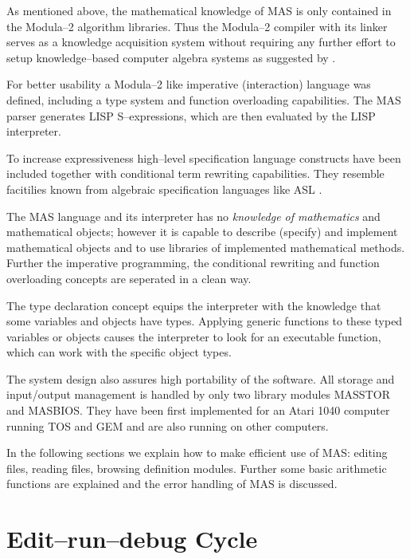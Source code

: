 As mentioned above, the mathematical knowledge 
of MAS is only contained in the Modula--2 algorithm libraries. 
Thus the Modula--2 compiler 
with its linker serves as a knowledge 
acquisition system without requiring any further effort 
to setup knowledge--based computer algebra 
systems as suggested by \cite{Calmet 87}.

For better usability a Modula--2 like
imperative (interaction) language was defined, including 
a type system and function overloading capabilities.
The MAS parser generates LISP 
S--expressions, 
which are then evaluated by the LISP 
interpreter.

To increase expressiveness high--level specification 
language constructs have been included together 
with conditional term rewriting capabilities.
They resemble facitilies known from 
algebraic specification languages like ASL \cite{Wirsing 86}.

The MAS language and its interpreter has no 
{\em knowledge of mathematics} and mathematical objects; 
however it is capable to describe (specify) and implement 
mathematical objects and to 
use libraries of implemented mathematical methods. 
Further the imperative programming, the conditional rewriting 
and function overloading concepts are seperated in a clean way.

The type declaration concept equips the interpreter with the 
knowledge
that some variables and objects have 
types. Applying generic functions
to these typed variables or objects causes the 
interpreter to look for an executable function, 
which can work with the specific object types. 

The system design also assures high portability of the software. 
All storage and input/output 
management is handled by only two library
modules MASSTOR and MASBIOS. They have been first implemented for
an Atari 1040 computer running TOS and GEM 
and are also running on other computers.

In the following sections we explain how to make efficient use of MAS:
editing files, reading files, browsing definition modules.
Further some basic arithmetic functions are explained and 
the error handling of MAS is discussed.


\section{Edit--run--debug Cycle}

